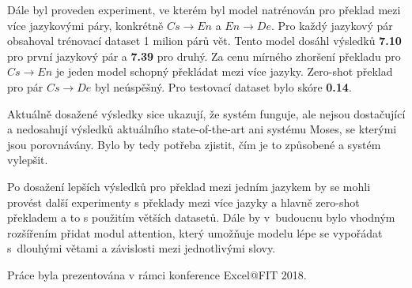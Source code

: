 Dále byl proveden experiment, ve kterém byl model natrénován pro překlad mezi více jazykovými páry, konkrétně $Cs\rightarrow En$ a $En\rightarrow De$. Pro každý jazykový pár obsahoval trénovací dataset 1 milion párů vět. Tento model dosáhl výsledků \textbf{7.10} pro první jazykový pár a \textbf{7.39} pro druhý. Za cenu mírného zhoršení překladu pro $Cs\rightarrow En$ je jeden model schopný překládat mezi více jazyky. Zero-shot překlad pro pár $Cs\rightarrow De$ byl neúspěšný. Pro testovací dataset bylo skóre \textbf{0.14}.

Aktuálně dosažené výsledky sice ukazují, že systém funguje, ale nejsou dostačující a nedosahují výsledků aktuálního state-of-the-art ani systému Moses, se kterými jsou porovnávány. Bylo by tedy potřeba zjistit, čím je to způsobené a systém vylepšit.

Po dosažení lepších výsledků pro překlad mezi jedním jazykem by se mohli provést další experimenty s překlady mezi více jazyky a hlavně zero-shot překladem a to s použitím větších datasetů. Dále by v~budoucnu bylo vhodným rozšířením přidat modul attention, který umožňuje modelu lépe se vypořádat s~dlouhými větami a závislosti mezi jednotlivými slovy.

Práce byla prezentována v rámci konference Excel@FIT 2018.


